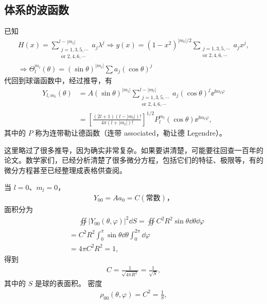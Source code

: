 \subsection{体系的波函数}
已知
\begin{align}
    H(x) = \sum_{\substack{j=1,3,5,\cdots \\\text{or } 2,4,6,\cdots}}^{l-|m_l|} a_j \lambda^j \Rightarrow y(x) = (1-x^2)^{|m_l|/2} \sum_{\substack{j=1,3,5,\cdots \\\text{or } 2,4,6,\cdots}} a_j x^j, 
\\
    \Rightarrow \Theta_l^{m_l} (\theta) = (\sin\theta)^{|m_l|} \sum a_j (\cos\theta)^j
\end{align}
代回到球谐函数中，经过推导，有
\begin{align}
    Y_{l,m_l}(\theta) 
    &= A (\sin\theta)^{|m_l|} 
    \sum_{\substack{j=1,3,5,\cdots \\\text{or } 2,4,6,\cdots}}^{l-|m_l|}
    a_j (\cos\theta)^j \ee^{\ii m_l \varphi} \\
    &= \left[
        \frac{(2l+1) (l-|m_l|)!}
        {4\pi(l+|m_l|)!}
    \right]^{1/2}
    P_l^{m_l}(\cos\theta) \ee^{\ii m_l \varphi},
\end{align}
其中的 $P$ 称为连带勒让德函数（连带 associated，勒让德 Legendre）。

这里略过了很多推导，因为确实非常复杂。如果要讲清楚，可能要往回查一百年的论文。数学家们，已经分析清楚了很多微分方程，包括它们的特征、极限等，有的微分方程甚至已经整理成表格供查阅。

当 $l=0$、$m_l = 0$，
\begin{align}
    Y_{00} = A a_0 = C (\text{常数})，
\end{align}
面积分为
\begin{align}
    &\phantom{=}\oiint |Y_{00}(\theta, \varphi)|^2 \dd S 
    = \oiint C^2 R^2 \sin\theta \dd\theta \dd\varphi\\
    &= C^2 R^2 \int_0^\pi \sin\theta \dd\theta \int_0^{2\pi} \dd\varphi \\
    &= 4 \pi C^2 R^2 = 1, 
\end{align}
得到
\begin{align}
    C = \frac1{\sqrt{4\pi R^2}} = \frac1{\sqrt S},
\end{align}
其中的 $S$ 是球的表面积。
密度
\begin{align}
    \rho_{00}(\theta, \varphi) = C^2 = \frac1S,
\end{align}

